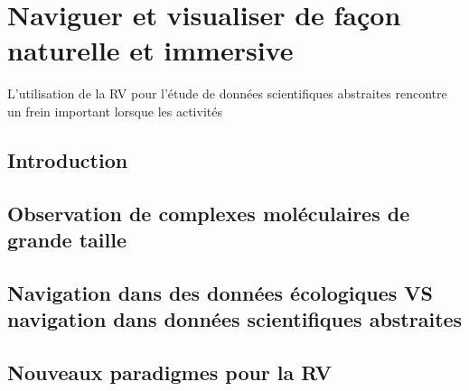 \chapter[Exploration interactive de données moléculaire en immersion]{Naviguer et visualiser de façon naturelle et immersive}
\label{Sec:CantorDigitalis}
\minitoc
\cleardoublepage

L'utilisation de la RV pour l'étude de données scientifiques abstraites rencontre un frein important lorsque les activités 

\section{Introduction}

\section{Observation de complexes moléculaires de grande taille}

\section{Navigation dans des données écologiques VS navigation dans données scientifiques abstraites}

\section{Nouveaux paradigmes pour la RV}


